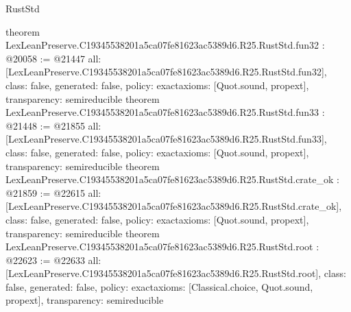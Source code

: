 \begin{lexlean}{RustStd}
\begin{coremodule}
{}
theorem LexLeanPreserve.C19345538201a5ca07fe81623ac5389d6.R25.RustStd.fun32 : @20058 := @21447 {
  all: [LexLeanPreserve.C19345538201a5ca07fe81623ac5389d6.R25.RustStd.fun32],
  class: false,
  generated: false,
  policy: exact{axioms: [Quot.sound, propext]},
  transparency: semireducible
}
theorem LexLeanPreserve.C19345538201a5ca07fe81623ac5389d6.R25.RustStd.fun33 : @21448 := @21855 {
  all: [LexLeanPreserve.C19345538201a5ca07fe81623ac5389d6.R25.RustStd.fun33],
  class: false,
  generated: false,
  policy: exact{axioms: [Quot.sound, propext]},
  transparency: semireducible
}
theorem LexLeanPreserve.C19345538201a5ca07fe81623ac5389d6.R25.RustStd.crate_ok : @21859 := @22615 {
  all: [LexLeanPreserve.C19345538201a5ca07fe81623ac5389d6.R25.RustStd.crate_ok],
  class: false,
  generated: false,
  policy: exact{axioms: [Quot.sound, propext]},
  transparency: semireducible
}
theorem LexLeanPreserve.C19345538201a5ca07fe81623ac5389d6.R25.RustStd.root : @22623 := @22633 {
  all: [LexLeanPreserve.C19345538201a5ca07fe81623ac5389d6.R25.RustStd.root],
  class: false,
  generated: false,
  policy: exact{axioms: [Classical.choice, Quot.sound, propext]},
  transparency: semireducible
}


\end{coremodule}
\end{lexlean}
